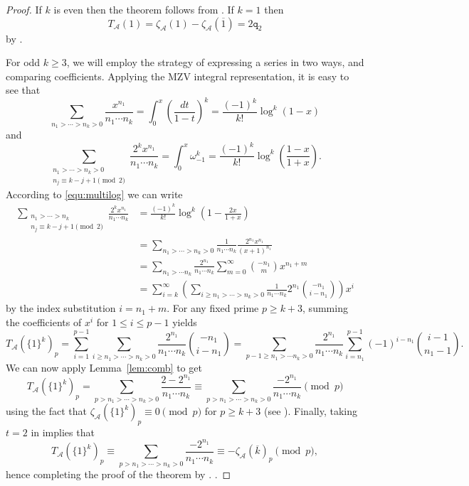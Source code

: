 \documentclass{article}
\newcommand\om{{\omega}}
\newcommand{\calA}{\mathcal{A}}
\newcommand{\ol}{\overline}
\theoremstyle{plain}
\theoremstyle{definition}
\begin{document}
\begin{proof}
If $k$ is even then the theorem follows from \cite[Prop.\ 7]{Zhao2023Dec}. If $k=1$ then
\begin{equation*}
T_\calA(1)=\zeta_\calA(1)-\zeta_\calA(\ol{1})=2\texttt{q}_2
\end{equation*}
by \cite[(8.14)]{Zhao2016}.

For odd $k\ge 3$, we will employ the strategy of expressing a series in two ways, and comparing coefficients. Applying the MZV integral representation, it is easy to see that
\begin{equation}\label{equ:multilog}
\sum_{n_1>\cdots >n_k>0}\frac{x^{n_1}}{n_1\cdots n_k}
=\int_0^{x}\left(\frac{dt}{1-t}\right)^k=\frac{(-1)^k}{k!}\log^{k}\left(1-x\right)
\end{equation}
and
\begin{equation*}
\sum_{\substack{n_1>\cdots >n_k>0\\n_j\equiv k-j+1\pmod 2}}\frac{2^kx^{n_1}}{n_1\cdots n_k}=\int_0^{x}\om_{-1}^k=\frac{(-1)^k}{k!}\log^{k}\left(\frac{1-x}{1+x}\right).
\end{equation*}
According to \eqref{equ:multilog} we can write
\begin{align*}
\sum_{\substack{n_1>\cdots >n_k\\n_j\equiv k-j+1\pmod 2}}\frac{2^kx^{n_1}}{n_1\cdots n_k}
&=\frac{(-1)^{k}}{k!}\log^{k}\left(1-\frac{2x}{1+x}\right)\\
&=\sum_{n_1>\cdots >n_k>0}\frac{1}{n_1\cdots n_{k}}\frac{2^{n_1}x^{n_1}}{(x+1)^{n_1}}\\
&=\sum_{n_1>\cdots n_k}\frac{2^{n_1}}{n_1\cdots n_k}\sum_{m=0}^{\infty}\binom{-n_1}{m}x^{n_1+m} \\
&=\sum_{i=k}^{\infty}\left(\sum_{i\ge n_1>\cdots>n_k>0}\frac{1}{n_1\cdots n_k}2^{n_1}\binom{-n_1}{i-n_1}\right)x^i
\end{align*}
by the index substitution $i=n_1+m$. For any fixed prime $p\ge k+3$, summing the coefficients of $x^i$ for $1\le i\le p-1$ yields
\begin{equation*}
T_\calA(\{1\}^k)_p=\sum_{i=1}^{p-1}\sum_{i\ge n_1>\cdots>n_k>0}\frac{2^{n_1}}{n_1\cdots n_k}\binom{-n_1}{i-n_1}
=\sum_{p-1\ge n_1>\cdots n_k>0}\frac{2^{n_1}}{n_1\cdots n_k}\sum_{i=n_1}^{p-1}(-1)^{i-n_1}\binom{i-1}{n_1-1}.
\end{equation*}
We can now apply Lemma~\ref{lem:comb} to get
\begin{equation*}
T_\calA(\{1\}^k)_p=\sum_{p>n_1>\cdots >n_{k}>0}\frac{2-2^{n_1}}{n_1\cdots n_k}
\equiv \sum_{p>n_1>\cdots >n_{k}>0}\frac{-2^{n_1}}{n_1\cdots n_k} \pmod{p}
\end{equation*}
using the fact that $\zeta_\calA\left(\{1\}^k\right)_p\equiv0 \pmod{p}$ for $p\ge k+3$ (see \cite[Lemma 8.5.3]{Zhao2016}). Finally, taking $t=2$ in \cite[(47)]{SakugawaSeki} implies that
\begin{equation*}
T_\calA(\{1\}^k)_p\equiv \sum_{p>n_1>\cdots >n_{k}>0}\frac{-2^{n_1}}{n_1\cdots n_k}\equiv -\zeta_\calA(\ol{k})_p \pmod{p},
\end{equation*}
hence completing the proof of the theorem by \cite[(8.15)]{Zhao2016}. .
\end{proof}
\end{document}

